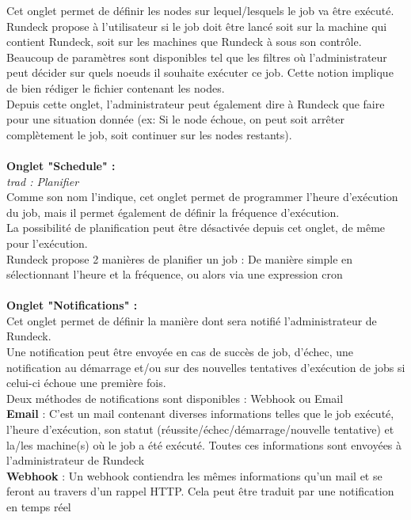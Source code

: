 \documentclass[12pt]{article}
\begin{document}
Cet onglet permet de définir les nodes sur lequel/lesquels le job va être exécuté. Rundeck propose à l'utilisateur si le job doit être lancé soit sur la machine qui contient Rundeck, soit sur les machines que Rundeck à sous son contrôle.
\\
Beaucoup de paramètres sont disponibles tel que les filtres où l'administrateur peut décider sur quels noeuds il souhaite exécuter ce job. Cette notion implique de bien rédiger le fichier contenant les nodes.
\\
Depuis cette onglet, l'administrateur peut également dire à Rundeck que faire pour une situation donnée (ex: Si le node échoue, on peut soit arrêter complètement le job, soit continuer sur les nodes restants).
\\
\vspace{0.2cm}
\\
\textbf{Onglet "Schedule" :}
\\
\textit{trad : Planifier}
\\
Comme son nom l'indique, cet onglet permet de programmer l'heure d'exécution du job, mais il permet également de définir la fréquence d'exécution.
\\
La possibilité de planification peut être désactivée depuis cet onglet, de même pour l'exécution.
\\
Rundeck propose 2 manières de planifier un job :  De manière simple en sélectionnant l'heure et la fréquence, ou alors via une expression cron 
\\
\vspace{0.2cm}
\\
\textbf{Onglet "Notifications" :}
\\
Cet onglet permet de définir la manière dont sera notifié l'administrateur de Rundeck.
\\
Une notification peut être envoyée en cas de succès de job, d'échec, une notification au démarrage et/ou sur des nouvelles tentatives d'exécution de jobs si celui-ci échoue une première fois.
\vspace{0.5cm}
\\
Deux méthodes de notifications sont disponibles : Webhook ou Email
\\
\textbf{Email} : C'est un mail contenant diverses informations telles que le job exécuté, l'heure d'exécution, son statut (réussite/échec/démarrage/nouvelle tentative) et la/les machine(s) où le job a été exécuté. Toutes ces informations sont envoyées à l'administrateur de Rundeck
\\
\textbf{Webhook} : Un webhook contiendra les mêmes informations qu'un mail et se feront au travers d'un rappel HTTP. Cela peut être traduit par une notification en temps réel 
\end{document}
